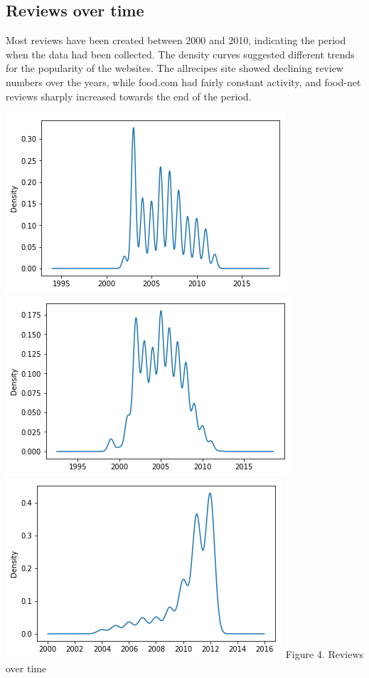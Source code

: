 \documentclass[11pt]{article}
\begin{document}
\subsection{Reviews over time}

Most reviews have been created between 2000 and 2010, indicating the period when the data had been collected. The density curves suggested different trends for the popularity of the websites. The allrecipes site showed declining review numbers over the years, while food.com had fairly constant activity, and food-net reviews sharply increased towards the end of the period.

\vspace{5mm}
\begin{center}
\includegraphics[scale=0.17]{time-1}
\includegraphics[scale=0.17]{time-2}
\includegraphics[scale=0.17]{time-3}
\label{time-dist} Figure 4. Reviews over time
\end{center}
\vspace{5mm}
\end{document}
